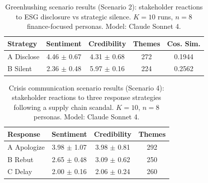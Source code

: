 \begin{table}[H]
\centering
\caption{Greenhushing scenario results (Scenario 2): stakeholder reactions to ESG disclosure
vs strategic silence. $K=10$ runs, $n=8$ finance-focused personas.
Model: Claude Sonnet 4.}
\label{tab:exp5_greenhushing}
\small
\begin{tabular}{@{}lcccc@{}}
\toprule
\textbf{Strategy} & \textbf{Sentiment} & \textbf{Credibility} & \textbf{Themes} & \textbf{Cos. Sim.} \\
\midrule
    A Disclose & 4.46 $\pm$ 0.67 & 4.31 $\pm$ 0.68 & 272 & 0.1944 \\
    B Silent & 2.36 $\pm$ 0.48 & 5.97 $\pm$ 0.16 & 224 & 0.2562 \\
\bottomrule
\end{tabular}
\end{table}


\begin{table}[H]
\centering
\caption{Crisis communication scenario results (Scenario 4): stakeholder reactions to
three response strategies following a supply chain scandal. $K=10$, $n=8$ personas.
Model: Claude Sonnet 4.}
\label{tab:exp6_crisis}
\small
\begin{tabular}{@{}lccc@{}}
\toprule
\textbf{Response} & \textbf{Sentiment} & \textbf{Credibility} & \textbf{Themes} \\
\midrule
    A Apologize & 3.98 $\pm$ 1.07 & 3.98 $\pm$ 0.81 & 292 \\
    B Rebut & 2.65 $\pm$ 0.48 & 3.09 $\pm$ 0.62 & 250 \\
    C Delay & 2.00 $\pm$ 0.16 & 2.06 $\pm$ 0.24 & 260 \\
\bottomrule
\end{tabular}
\end{table}


